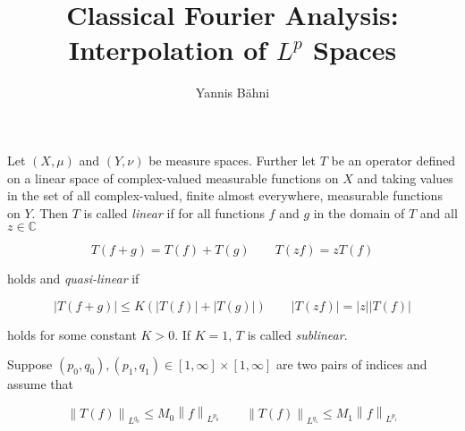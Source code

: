 


\title{Classical Fourier Analysis: Interpolation of $L^p$ Spaces}
\author{Yannis B\"{a}hni}
\address[Yannis B\"{a}hni]{University of Zurich, R\"{a}mistrasse 71, 8006 Zurich}

\maketitle

\addtocounter{section}{1}

\begin{mdframed}
	\begin{definition}
		Let $(X,\mu)$ and $(Y,\nu)$ be measure spaces. Further let $T$ be an operator defined on a linear space of complex-valued measurable functions on $X$ and taking values in the set of all complex-valued, finite almost everywhere, measurable functions on $Y$. Then $T$ is called \emph{linear} if for all functions $f$ and $g$ in the domain of $T$ and all $z \in \mathbb{C}$ 

		\begin{equation*}
			T\left( f + g \right) = T(f) + T(g) \qquad T\left( zf \right) = zT(f)
		\end{equation*}

		holds and \emph{quasi-linear} if

		\begin{equation*}
			\left| T\left( f + g \right) \right| \leqslant K \left( \left| T(f)\right| + \left| T(g)\right| \right) \qquad \left| T(zf) \right| = \left| z\right| \left| T(f)\right|
		\end{equation*}

		holds for some constant $K > 0$. If $K = 1$, $T$ is called \emph{sublinear}.
	\end{definition}
\end{mdframed}

\vspace{2mm}

Suppose $\left(p_0,q_0\right),\left( p_1,q_1 \right) \in [1,\infty]\times [1,\infty]$ are two pairs of indices and assume that 

\begin{equation*}
	\left\|T(f)\right\|_{L^{q_0}} \leqslant M_0\left\|f\right\|_{L^{p_0}} \qquad \left\|T(f)\right\|_{L^{q_1}} \leqslant M_1\left\|f\right\|_{L^{p_1}}
\end{equation*}

